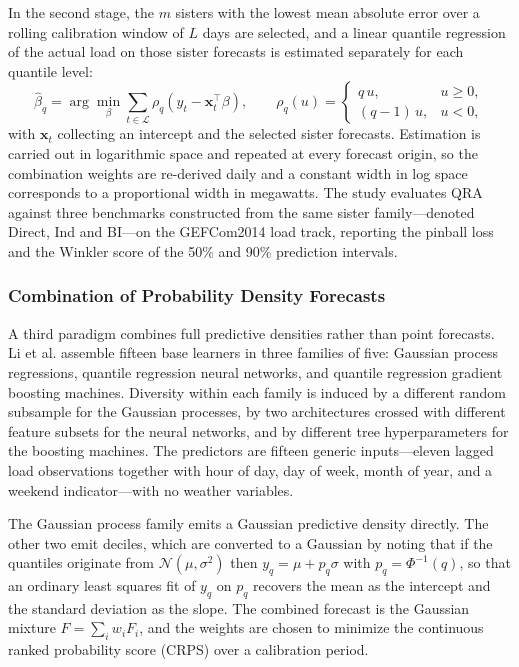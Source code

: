 \documentclass[10pt,journal,compsoc]{IEEEtran}
\begin{document}
In the second stage, the $m$ sisters with the lowest mean absolute error over a rolling
calibration window of $L$ days are selected, and a linear quantile regression
\cite{koenker1978regression} of the actual load on those sister forecasts is estimated
separately for each quantile level:
\begin{equation}
\hat{\beta}_q = \arg\min_{\beta}
  \sum_{t \in \mathcal{L}} \rho_q\!\left(y_t - \mathbf{x}_t^{\top}\beta\right),
\qquad
\rho_q(u) =
\begin{cases}
q\,u, & u \ge 0,\\
(q-1)\,u, & u < 0 ,
\end{cases}
\end{equation}
with $\mathbf{x}_t$ collecting an intercept and the selected sister forecasts. Estimation is
carried out in logarithmic space and repeated at every forecast origin, so the combination
weights are re-derived daily and a constant width in log space corresponds to a proportional
width in megawatts. The study evaluates QRA against three benchmarks constructed from the
same sister family---denoted Direct, Ind and BI---on the GEFCom2014 load track, reporting the
pinball loss and the Winkler score of the 50\% and 90\% prediction intervals.

\subsubsection{Combination of Probability Density Forecasts}
A third paradigm combines full predictive densities rather than point forecasts. Li et al.
\cite{li2020combining} assemble fifteen base learners in three families of five: Gaussian
process regressions, quantile regression neural networks, and quantile regression gradient
boosting machines. Diversity within each family is induced by a different random subsample
for the Gaussian processes, by two architectures crossed with different feature subsets for
the neural networks, and by different tree hyperparameters for the boosting machines. The
predictors are fifteen generic inputs---eleven lagged load observations together with hour of
day, day of week, month of year, and a weekend indicator---with no weather variables.

The Gaussian process family emits a Gaussian predictive density directly. The other two emit
deciles, which are converted to a Gaussian by noting that if the quantiles originate from
$\mathcal{N}(\mu,\sigma^2)$ then $y_q = \mu + p_q\sigma$ with $p_q = \Phi^{-1}(q)$, so that an
ordinary least squares fit of $y_q$ on $p_q$ recovers the mean as the intercept and the
standard deviation as the slope. The combined forecast is the Gaussian mixture
$F = \sum_i w_i F_i$, and the weights are chosen to minimize the continuous ranked probability
score (CRPS) \cite{gneiting2007strictly} over a calibration period.
\end{document}
